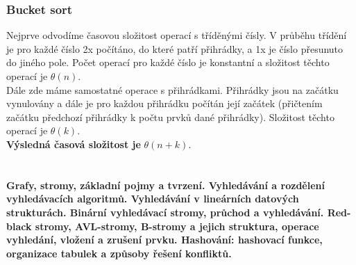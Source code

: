 \documentclass[10pt,a4paper]{article}
\begin{document}
\subsubsection{Bucket sort}
Nejprve odvodíme časovou složitost operací s tříděnými čísly. V průběhu třídění je pro každé číslo 2x počítáno, do které patří přihrádky, a 1x je číslo přesunuto do jiného pole. Počet operací pro každé číslo je konstantní a složitost těchto operací je $\theta (n)$. \\
Dále zde máme samostatné operace s přihrádkami. Přihrádky jsou na začátku vynulovány a dále je pro každou přihrádku počítán její začátek (přičtením začátku předchozí přihrádky k počtu prvků dané přihrádky). Složitost těchto operací je $\theta (k)$. \\
\textbf{Výsledná časová složitost je} $\theta (n+k)$.



\newpage

\section{}
\paragraph{Grafy, stromy, základní pojmy a tvrzení. Vyhledávání a rozdělení vyhledávacích algoritmů. Vyhledávání v lineárních datových strukturách. Binární vyhledávací stromy, průchod a vyhledávání. Red-black stromy, AVL-stromy, B-stromy a jejich struktura, operace vyhledání, vložení a zrušení prvku. Hashování: hashovací funkce, organizace tabulek a způsoby řešení konfliktů.}
\end{document}
